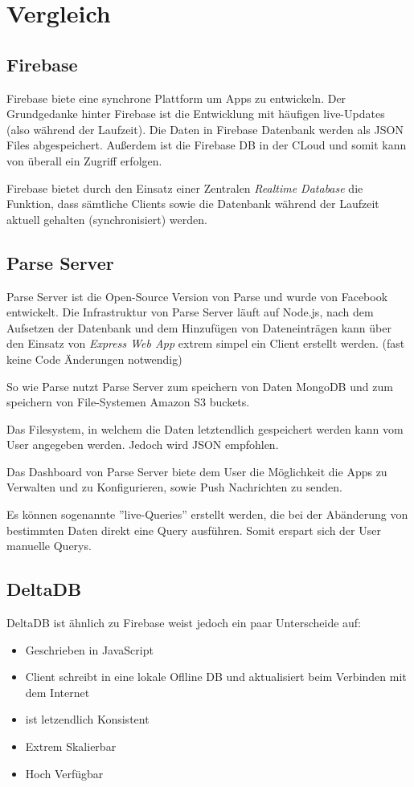 \section{Vergleich}
\subsection{Firebase}
Firebase biete eine synchrone Plattform um Apps zu entwickeln. Der Grundgedanke hinter Firebase ist die Entwicklung mit häufigen live-Updates (also während der Laufzeit). Die Daten in Firebase Datenbank werden als JSON Files abgespeichert. Außerdem ist die Firebase DB in der CLoud und somit kann von überall ein Zugriff erfolgen.

Firebase bietet durch den Einsatz einer Zentralen \textit{Realtime Database} die Funktion, dass sämtliche Clients sowie die Datenbank während der Laufzeit aktuell gehalten (synchronisiert) werden. 

\subsection{Parse Server}
Parse Server ist die Open-Source Version von Parse und wurde von Facebook entwickelt. Die Infrastruktur von Parse Server läuft auf Node.js, nach dem Aufsetzen der Datenbank und dem Hinzufügen von Dateneinträgen kann über den Einsatz von \textit{Express Web App} extrem simpel ein Client erstellt werden. (fast keine Code Änderungen notwendig)

So wie Parse nutzt Parse Server zum speichern von Daten MongoDB und zum speichern von File-Systemen Amazon S3 buckets.

Das Filesystem, in welchem die Daten letztendlich gespeichert werden kann vom User angegeben werden. Jedoch wird JSON empfohlen.

Das Dashboard von Parse Server biete dem User die Möglichkeit die Apps zu Verwalten und zu Konfigurieren, sowie Push Nachrichten zu senden.

Es können sogenannte ''live-Queries'' erstellt werden, die bei der Abänderung von bestimmten Daten direkt eine Query ausführen. Somit erspart sich der User manuelle Querys.


\subsection{DeltaDB}
DeltaDB ist ähnlich zu Firebase weist jedoch ein paar Unterscheide auf:
\begin{itemize}
	\item Geschrieben in JavaScript
	\item Client schreibt in eine lokale Oflline DB und aktualisiert beim Verbinden mit dem Internet
	\item ist letzendlich Konsistent
	\item Extrem Skalierbar
	\item Hoch Verfügbar
	
\end{itemize}
\clearpage
